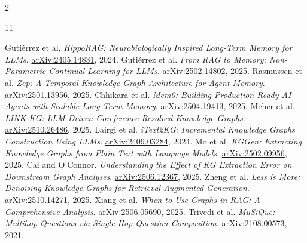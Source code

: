 \documentclass[10pt]{article}
\begin{document}
\begin{multicols}{2}
\begin{thebibliography}{11}
\tiny
\raggedright
\setlength{\itemsep}{0pt}
 Guti\'errez et al. \emph{HippoRAG: Neurobiologically Inspired Long-Term Memory for LLMs}. \href{https://arxiv.org/abs/2405.14831}{arXiv:2405.14831}, 2024.
 Guti\'errez et al. \emph{From RAG to Memory: Non-Parametric Continual Learning for LLMs}. \href{https://arxiv.org/abs/2502.14802}{arXiv:2502.14802}, 2025.
 Rasmussen et al. \emph{Zep: A Temporal Knowledge Graph Architecture for Agent Memory}. \href{https://arxiv.org/abs/2501.13956}{arXiv:2501.13956}, 2025.
 Chhikara et al. \emph{Mem0: Building Production-Ready AI Agents with Scalable Long-Term Memory}. \href{https://arxiv.org/abs/2504.19413}{arXiv:2504.19413}, 2025.
 Meher et al. \emph{LINK-KG: LLM-Driven Coreference-Resolved Knowledge Graphs}. \href{https://arxiv.org/abs/2510.26486}{arXiv:2510.26486}, 2025.
 Lairgi et al. \emph{iText2KG: Incremental Knowledge Graphs Construction Using LLMs}. \href{https://arxiv.org/abs/2409.03284}{arXiv:2409.03284}, 2024.
 Mo et al. \emph{KGGen: Extracting Knowledge Graphs from Plain Text with Language Models}. \href{https://arxiv.org/abs/2502.09956}{arXiv:2502.09956}, 2025.
 Cai and O'Connor. \emph{Understanding the Effect of KG Extraction Error on Downstream Graph Analyses}. \href{https://arxiv.org/abs/2506.12367}{arXiv:2506.12367}, 2025.
 Zheng et al. \emph{Less is More: Denoising Knowledge Graphs for Retrieval Augmented Generation}. \href{https://arxiv.org/abs/2510.14271}{arXiv:2510.14271}, 2025.
 Xiang et al. \emph{When to Use Graphs in RAG: A Comprehensive Analysis}. \href{https://arxiv.org/abs/2506.05690}{arXiv:2506.05690}, 2025.
 Trivedi et al. \emph{MuSiQue: Multihop Questions via Single-Hop Question Composition}. \href{https://arxiv.org/abs/2108.00573}{arXiv:2108.00573}, 2021.
\end{thebibliography}
\end{multicols}
\end{document}
